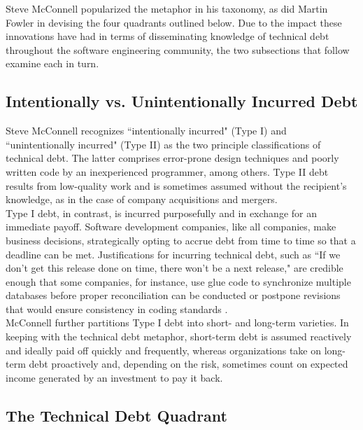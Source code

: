 Steve McConnell \cite{mcconnell} popularized the metaphor in his taxonomy, as did Martin Fowler \cite{fowler} in devising the four quadrants outlined below.  Due to the impact these innovations have had in terms of disseminating knowledge of technical debt throughout the software engineering community, the two subsections that follow examine each in turn.


\subsection{Intentionally vs. Unintentionally Incurred Debt}

Steve McConnell recognizes ``intentionally incurred" (Type I) and ``unintentionally incurred" (Type II) as the two principle classifications of technical debt.  The latter comprises error-prone design techniques and poorly written code by an inexperienced programmer, among others.  Type II debt results from low-quality work and is sometimes assumed without the recipient's knowledge, as in the case of company acquisitions and mergers.\\
Type I debt, in contrast, is incurred purposefully and in exchange for an immediate payoff. Software development companies, like all companies, make business decisions, strategically opting to accrue debt from time to time so that a deadline can be met. Justifications for incurring technical debt, such as ``If we don't get this release done on time, there won't be a next release," are credible enough that some companies, for instance, use glue code to synchronize multiple databases before proper reconciliation can be conducted or postpone revisions that would ensure consistency in coding standards \cite{mcconnell}.\\
McConnell further partitions Type I debt into short- and long-term varieties. In keeping with the technical debt metaphor, short-term debt is assumed reactively and ideally paid off quickly and frequently, whereas organizations take on long-term debt proactively and, depending on the risk, sometimes count on expected income generated by an investment to pay it back.



\subsection{The Technical Debt Quadrant}

